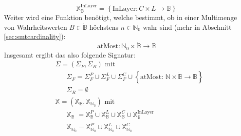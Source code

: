 \[
    \mathbb{X}_{\mathbb{B}}^{\text{InLayer}} = \left\{ \text{InLayer}: C \times L \rightarrow \mathbb{B} \right\}
\]
Weiter wird eine Funktion benötigt, welche bestimmt, ob in einer Multimenge von Wahrheitswerten $B \in \dot{\mathbb{B}}$ höchstens $n \in \mathbb{N}_0$ wahr sind (mehr in Abschnitt \ref{sec:smtcardinality}):
\[
    \text{atMost}: \mathbb{N}_0 \times \dot{\mathbb{B}} \rightarrow \mathbb{B}
\]
Insgesamt ergibt das also folgende Signatur:
\begin{align*}
    &\hspace{0pt} \Sigma = \left( \Sigma_F, \Sigma_R \right) \text{ mit } \\
    &\hspace{20pt} \Sigma_F = \Sigma_{F}^{P} \cup \Sigma_{F}^{L} \cup \Sigma_{F}^{C} \cup \left\{ \text{atMost: } \mathbb{N} \times \dot{\mathbb{B}} \rightarrow \mathbb{B} \right\}\\
    &\hspace{20pt} \Sigma_R = \emptyset \\
    &\hspace{0pt} \mathbb{X} = (\mathbb{X}_{\mathbb{B}}, \mathbb{X}_{\mathbb{N}_0}) \text{ mit} \\
    &\hspace{20pt} \mathbb{X}_{\mathbb{B}_{\phantom{0}}} = \mathbb{X}^{P}_{\mathbb{B}} \cup \mathbb{X}^{L}_{\mathbb{B}} \cup \mathbb{X}^{C}_{\mathbb{B}} \cup \mathbb{X}^{\text{InLayer}}_{\mathbb{B}} \\
    &\hspace{20pt} \mathbb{X}_{\mathbb{N}_0} = \mathbb{X}^{P}_{\mathbb{N}_0} \cup \mathbb{X}^{L}_{\mathbb{N}_0} \cup \mathbb{X}^{C}_{\mathbb{N}_0}
\end{align*}

